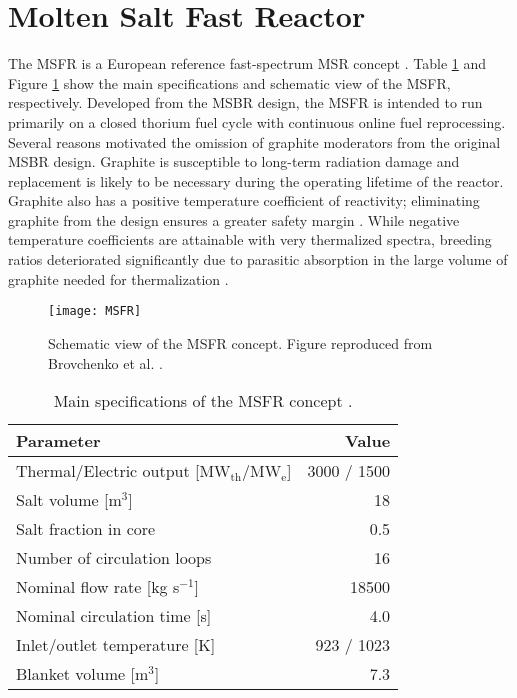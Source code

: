 \section{Molten Salt Fast Reactor}

The \gls{MSFR} is a European reference fast-spectrum \gls{MSR} concept
\cite{mathieu_thorium_2006, merle_optimized_2007}. Table \ref{table:msfr} and
Figure \ref{fig:msfr} show the main specifications and schematic view of the
\gls{MSFR}, respectively. Developed from the \gls{MSBR} design, the
\gls{MSFR} is intended to run primarily on a closed thorium fuel cycle with
continuous online fuel reprocessing. Several reasons motivated the omission of
graphite moderators from the original \gls{MSBR} design. Graphite is
susceptible to
long-term radiation damage and replacement is likely to be necessary during
the operating lifetime of the reactor. Graphite also has a positive
temperature coefficient of reactivity; eliminating graphite from the design
ensures a greater safety margin \cite{mathieu_thorium_2006}. While negative
temperature coefficients are attainable with very thermalized spectra,
breeding ratios deteriorated significantly due to parasitic absorption in the
large volume of graphite needed for thermalization
\cite{mathieu_thorium_2006}.
%
\begin{figure}[htb!] 
	\centering
	\texttt{[image: MSFR]}
	\caption{Schematic view of the MSFR concept. Figure reproduced from
	Brovchenko et al. \cite{brovchenko_design-related_2013}.}
	\label{fig:msfr}
\end{figure}
%
\begin{table}[htb!]
    \small
	\caption{Main specifications of the \gls{MSFR} concept
				\cite{serp_molten_2014}.}
	\centering
	\begin{tabular}{ l r }
		\hline
		Parameter & Value \\
		\hline
		Thermal/Electric output [MW$_{\text{th}}$/MW$_{\text{e}}$] & 3000 /
		1500 
		\\
		Salt volume [m$^3$] & 18 \\
		Salt fraction in core & 0.5 \\
		Number of circulation loops & 16 \\
		Nominal flow rate [kg s$^{-1}$] & 18500  \\
		Nominal circulation time [s] & 4.0 \\
		Inlet/outlet temperature [K] & 923 / 1023 \\
		Blanket volume [m$^3$] & 7.3\\
		\hline
	\end{tabular}
	\label{table:msfr}
\end{table}

